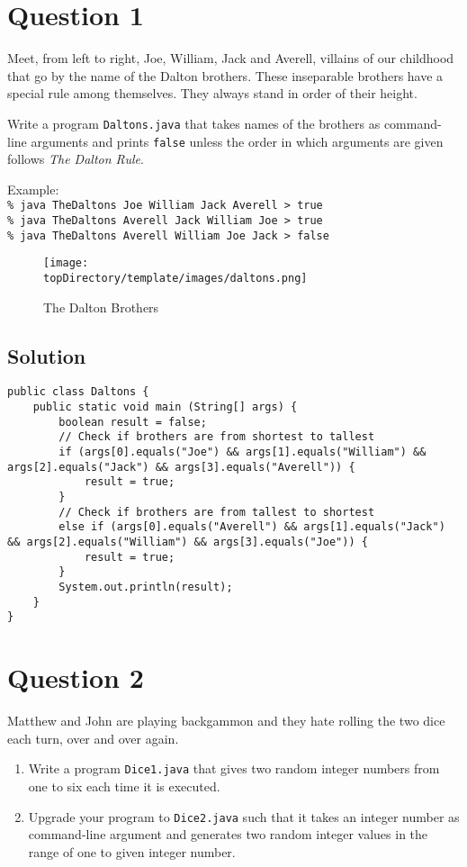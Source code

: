 \section*{Question 1}
Meet, from left to right, Joe, William, Jack and Averell, villains of our childhood that go by the name of the Dalton brothers. These inseparable brothers have a special rule among themselves. They always stand in order of their height.

Write a program \texttt{Daltons.java} that takes names of the brothers as command-line arguments and prints \texttt{false} unless the order in which arguments are given follows \textit{The Dalton Rule}.

Example:\\
\texttt{\% java TheDaltons Joe William Jack Averell > true}\\
\texttt{\% java TheDaltons Averell Jack William Joe > true}\\
\texttt{\% java TheDaltons Averell William Joe Jack > false}
\begin{figure}[H]\centering
\texttt{[image: \\topDirectory/template/images/daltons.png]}
\caption{The Dalton Brothers}\label{fig1}
\end{figure}
\subsection*{Solution}
\lstset{language=Java}
\begin{lstlisting}
public class Daltons {
	public static void main (String[] args) {
		boolean result = false;
		// Check if brothers are from shortest to tallest
		if (args[0].equals("Joe") && args[1].equals("William") && args[2].equals("Jack") && args[3].equals("Averell")) {
			result = true;
		}
		// Check if brothers are from tallest to shortest
		else if (args[0].equals("Averell") && args[1].equals("Jack") && args[2].equals("William") && args[3].equals("Joe")) {
			result = true;
		}
		System.out.println(result);
	}
}
\end{lstlisting}
\section*{Question 2}
Matthew and John are playing backgammon and they hate rolling the two dice each turn, over and over again.
\begin{enumerate}
\item Write a program \texttt{Dice1.java} that gives two random integer numbers from one to six each time it is executed.
\item Upgrade your program to \texttt{Dice2.java} such that it takes an integer number as command-line argument and generates two random integer values in the range of one to given integer number.
\end{enumerate}
